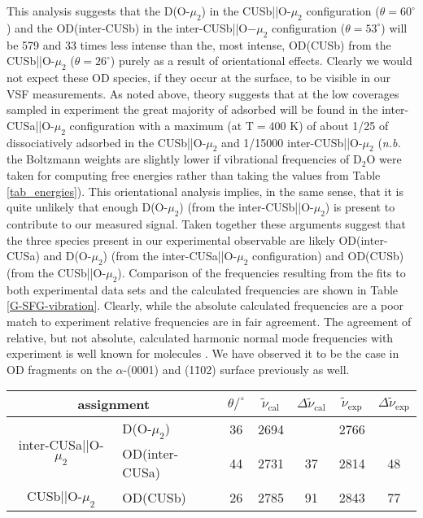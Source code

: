 \documentclass[twoside,twocolumn,9pt]{article}
\begin{document}
This analysis suggests that the D(O-$\mu_2$) in the CUSb||O-$\mu_2$ configuration ($\theta=60^\circ$) and the OD(inter-CUSb) in the inter-CUSb||O$-\mu_2$ configuration ($\theta=53^\circ$) will be 579 and 33 times less intense than the, most intense, OD(CUSb) from the CUSb||O-$\mu_2$ ($\theta=26^\circ$) purely as a result of orientational effects. Clearly we would not expect these OD species, if they occur at the surface, to be visible in our VSF measurements. As noted above, theory suggests that at the low coverages sampled in experiment the great majority of adsorbed  will be found in the inter-CUSa||O-$\mu_2$ configuration with a maximum (at $\text{T}=400$ K) of about 
 1/25 of  dissociatively adsorbed in the CUSb||O-$\mu_2$ and 1/15000 inter-CUSb||O-$\mu_2$ (\textit{n.b.} the Boltzmann weights are 
 slightly lower if vibrational frequencies of D$_2$O were taken 
 for computing free energies rather than taking 
 the values from Table \ref{tab_energies}).
This orientational analysis implies, in the same sense, that it is quite unlikely that enough D(O-$\mu_2$) (from the inter-CUSb||O-$\mu_2$) is present to contribute to our measured signal. Taken together these arguments suggest that the three species present in our experimental observable are likely OD(inter-CUSa) and D(O-$\mu_2$) (from the inter-CUSa||O-$\mu_2$ configuration) and OD(CUSb) (from the CUSb||O-$\mu_2$). Comparison of the frequencies resulting from the fits to both experimental data sets and the calculated frequencies are shown in Table \ref{G-SFG-vibration}. Clearly, while the absolute calculated frequencies are a poor match to experiment relative frequencies are in fair agreement. The agreement of relative, but not absolute, calculated harmonic normal mode frequencies with experiment is well known for molecules \cite{scot96}. We have observed it to be the case in OD fragments on the $\alpha$-(0001) and (1\=102) surface previously as well\cite{kirsch2014,tong2015optically,wirth2016characterization}.
\begin{table*}
\begin{center}
\caption{Vibrational frequencies
 and VSF resonances as observed at $300$ and $400\,$K, all
 in cm$^{-1}$. Also listed are
 frequency differences $\Delta {\tilde{\nu}}$, relative to the lowest frequency.
 An assignment of the modes is given.
 The O-D tilting angles $\theta$ are listed once more for clarity.}
 \label{G-SFG-vibration}
\begin{tabular}{cl|c|cc|cc}
\multicolumn{2}{c|}{assignment}   & $\theta / ^{\circ}$ & $\tilde{\nu}_\mathrm{cal}$ 
 & $\Delta{\tilde{\nu}}_{\mathrm{cal}}$ & $\tilde{\nu}_\mathrm{exp}$ & $\Delta{\tilde{\nu}}_{\mathrm{exp}}$ \\
    \hline
\multirow{2}{*}{inter-CUSa||O-$\mu_2$} & D(O-$\mu_2$) & 36 &  2694 &    & 2766 &    \\
& OD(inter-CUSa)  & 44 & 2731 & 37 & 2814 & 48  \\
\hline
CUSb||O-$\mu_2$ & OD(CUSb)       & 26 & 2785 & 91 & 2843 & 77 
\\
  \end{tabular}
\end{center}
\end{table*}
%
\end{document}
